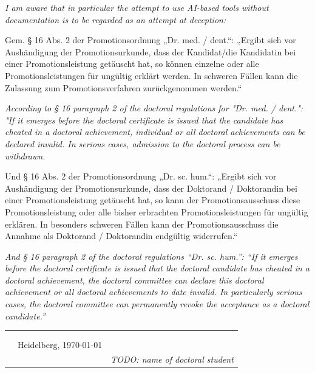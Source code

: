 \emph{\small\color{dkfzgray2} I am aware that in particular the attempt to use AI-based tools without documentation is to be regarded as an attempt at deception:}

Gem. § 16 Abs. 2 der Promotionsordnung „Dr. med. / dent.“:
„Ergibt sich vor Aushändigung der Promotionsurkunde, dass der Kandidat/die Kandidatin bei einer Promotionsleistung getäuscht hat, so können einzelne oder alle Promotionsleistungen für ungültig erklärt werden. In schweren Fällen kann die Zulassung zum Promotionsverfahren zurückgenommen werden.“

\emph{\small\color{dkfzgray2} According to § 16 paragraph 2 of the doctoral regulations for "Dr. med. / dent.":
"If it emerges before the doctoral certificate is issued that the candidate has cheated in a doctoral achievement, individual or all doctoral achievements can be declared invalid. In serious cases, admission to the doctoral process can be withdrawn.}

Und § 16 Abs. 2 der Promotionsordnung „Dr. sc. hum.“:
„Ergibt sich vor Aushändigung der Promotionsurkunde, dass der Doktorand / Doktorandin bei einer Promotionsleistung getäuscht hat, so kann der Promotionsausschuss diese Promotionsleistung oder alle bisher erbrachten Promotionsleistungen für ungültig erklären. In besonders schweren Fällen kann der Promotionsausschuss die Annahme als Doktorand / Doktorandin endgültig widerrufen.“

\emph{\small\color{dkfzgray2} And § 16 paragraph 2 of the doctoral regulations “Dr. sc. hum.”:
“If it emerges before the doctoral certificate is issued that the doctoral candidate has cheated in a doctoral achievement, the doctoral committee can declare this doctoral achievement or all doctoral achievements to date invalid. In particularly serious cases, the doctoral committee can permanently revoke the acceptance as a doctoral candidate.”}

\begin{tabular}{p{3cm}p{5cm}p{4cm}}
      &  & \\
      & & \\
      &Heidelberg, \today & \hrulefill\\
      & & \textit{TODO: name of doctoral student}
\end{tabular}
